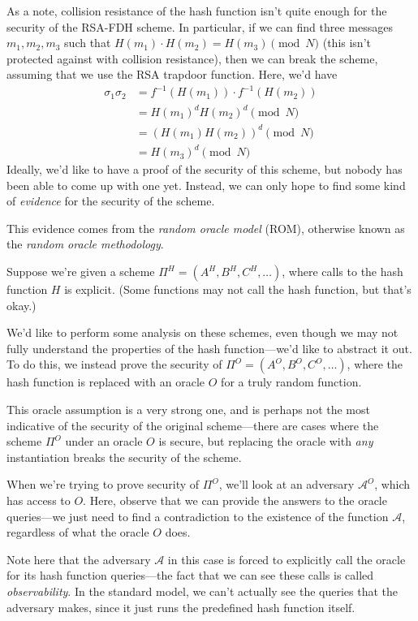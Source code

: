 As a note, collision resistance of the hash function isn't quite enough for the security of the RSA-FDH scheme. In particular, if we can find three messages $m_1, m_2, m_3$ such that $H(m_1) \cdot H(m_2) = H(m_3) \pmod{N}$ (this isn't protected against with collision resistance), then we can break the scheme, assuming that we use the RSA trapdoor function. Here, we'd have
\begin{align*}
    \sigma_1 \sigma_2 &= f^{-1}(H(m_1)) \cdot f^{-1}(H(m_2)) \\
                      &= H(m_1)^d H(m_2)^d \pmod{N} \\
                      &= (H(m_1) H(m_2))^d \pmod{N} \\
                      &= H(m_3)^d \pmod{N}
\end{align*}
Ideally, we'd like to have a proof of the security of this scheme, but nobody has been able to come up with one yet. Instead, we can only hope to find some kind of \emph{evidence} for the security of the scheme.

This evidence comes from the \emph{random oracle model} (ROM), otherwise known as the \emph{random oracle methodology}.

Suppose we're given a scheme $\Pi^H = (A^H, B^H, C^H, \ldots)$, where calls to the hash function $H$ is explicit. (Some functions may not call the hash function, but that's okay.)

We'd like to perform some analysis on these schemes, even though we may not fully understand the properties of the hash function---we'd like to abstract it out. To do this, we instead prove the security of $\Pi^O = (A^O, B^O, C^O, \ldots)$, where the hash function is replaced with an oracle $O$ for a truly random function.

This oracle assumption is a very strong one, and is perhaps not the most indicative of the security of the original scheme---there are cases where the scheme $\Pi^O$ under an oracle $O$ is secure, but replacing the oracle with \emph{any} instantiation breaks the security of the scheme.

When we're trying to prove security of $\Pi^O$, we'll look at an adversary $\mathcal{A}^O$, which has access to $O$. Here, observe that we can provide the answers to the oracle queries---we just need to find a contradiction to the existence of the function $\mathcal{A}$, regardless of what the oracle $O$ does.

Note here that the adversary $\mathcal{A}$ in this case is forced to explicitly call the oracle for its hash function queries---the fact that we can see these calls is called \emph{observability}. In the standard model, we can't actually see the queries that the adversary makes, since it just runs the predefined hash function itself.

